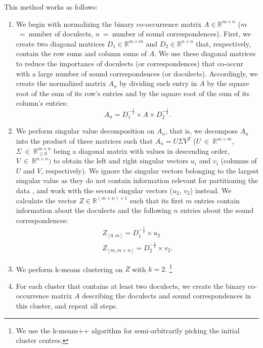 \documentclass[a4paper]{article}
\newcommand{\R}{\mathds{R}}
\begin{document}
This method works as follows:

\begin{enumerate}
\item 
We begin with normalizing the binary co-occurrence matrix
$A \in \R^{m \times n}$ ($m$~=~number of doculects, $n$~=~number of sound correspondences).
First, we create two diagonal matrices
$D_1  \in \R^{m \times m}$ and $D_2 \in \R^{n \times n}$ that, respectively,
contain the row sums and column sums of $A$.
We use these diagonal matrices to reduce
the importance of doculects (or correspondences)
that co-occur with a large number
of sound correspondences (or doculects).
Accordingly, we create the normalized matrix $A_n$
by dividing each entry in $A$ by
the square root of the sum of its row's entries
and by the square root of the sum of its column's entries:
\begin{equation*}
A_n = D_1^{-\frac{1}{2}} \times A \times D_2^{-\frac{1}{2}}.
\end{equation*}

\item
We perform singular value decomposition on $A_n$,
that is, we decompose $A_n$ into the product of three matrices such that
$A_n = U\Sigma{}V^T$
($U~\in~\R^{m \times m}$,
$\Sigma{}~\in~\R_{\geq 0}^{m \times n}$ being a 
diagonal matrix with values in descending order,
$V~\in~\R^{n \times n})$
to obtain the left and right singular vectors $u_i$ and $v_i$
(columns of $U$ and $V$, respectively).
We ignore the singular vectors belonging
to the largest singular value as they do not contain
information relevant for partitioning the data \citep{kluger2003spectral},
and work with the second singular vectors ($u_2$, $v_2$) instead.
We calculate the vector $Z \in \R^{(m + n) \times 1}$ such that
its first $m$ entries contain information about the doculects
and the following $n$ entries about the sound correspondences:
\begin{align*}
Z_{[0, m]} = D_1^{-\frac{1}{2}} \times u_2\\
Z_{[m, m+n]} = D_2^{-\frac{1}{2}} \times v_2
.
\end{align*}

\item
We perform k-means clustering on $Z$ with $k = 2$.%
\footnote{%
We use the k-means++ algorithm \citep{arthur2007kmeanspp} for semi-arbitrarily picking the initial cluster centres.}

\item
For each cluster that contains at least two doculects,
we create the binary co-occurrence matrix $A$ describing
the doculects and sound correspondences in this cluster,
and repeat all steps.
\end{enumerate}
\end{document}
